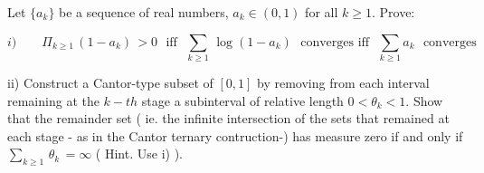 \endproclaim

 Let $\{ a_k\}$ be a sequence of real numbers, $ a_k \in (0, 1)$ for all $k \ge 1$. Prove:

$$i) \qquad  \Pi_{k\ge1} \, (1 - a_k)  \, > 0 \, \, \text{ iff } \, \,   \sum_{k\ge1}\, \log (1 - a_k) \, \,  \text{ converges iff } \, \,  \sum_{k \ge 1} a_k   \, \, \text{ converges } $$

ii) \qquad Construct a Cantor-type subset of $[0,1]$ by removing from each interval remaining at the $k-th$ stage a subinterval of relative length $0 < \theta_k <1$. Show that the remainder set ( ie. the infinite intersection of the sets that remained at each stage - as in the Cantor ternary contruction-) has measure zero if and only if $\sum_{k \ge 1} \, \theta_k \,  = \infty $ ( Hint. Use i) ).   

\endproclaim



\enddocument
























\enddocument 

















































